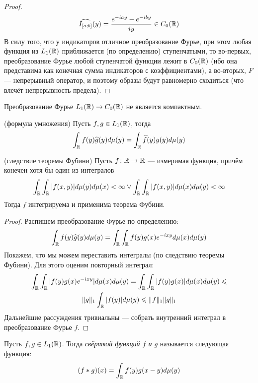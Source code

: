 \begin{proof}
	\[
		\widehat{I_{[a; b]}}(y) = \frac{e^{-iay} - e^{-iby}}{iy} \in C_0(\mathbb{R})
	\]
	В силу того, что у индикаторов отличное преобразование Фурье, при этом любая функция из $L_1(\mathbb{R})$ приближается (по определению) ступенчатыми, то во-первых, преобразование Фурье любой ступенчатой функции лежит в $C_0(\mathbb{R})$ (ибо она представима как конечная сумма индикаторов с коэффициентами), а во-вторых, $F$ --- непрерывный оператор, и поэтому образы будут равномерно сходиться (что влечёт непрерывность предела).
\end{proof}

\begin{exercise}
	Преобразование Фурье $L_1(\mathbb{R}) \to C_0(\mathbb{R})$ не является компактным.
\end{exercise}

\begin{proposition} (формула умножения)
	Пусть $f, g \in L_1(\mathbb{R})$, тогда
	\[
		\int_{\mathbb{R}} f(y)\widehat{g}(y)d\mu(y) = \int_{\mathbb{R}} \widehat{f}(y)g(y)d\mu(y)
	\]
\end{proposition}

\begin{reminder} (следствие теоремы Фубини)
	Пусть $f \colon \mathbb{R} \to \mathbb{R}$ --- измеримая функция, причём конечен хотя бы один из интегралов
	\[
		\int_{\mathbb{R}} \int_{\mathbb{R}} |f(x, y)|d\mu(y)d\mu(x) < \infty \vee \int_{\mathbb{R}} \int_{\mathbb{R}} |f(x, y)|d\mu(x)d\mu(y) < \infty
	\]
	Тогда $f$ интегрируема и применима теорема Фубини.
\end{reminder}

\begin{proof}
	Распишем преобразование Фурье по определению:
	\[
		\int_{\mathbb{R}} f(y)\widehat{g}(y)d\mu(y) = \int_{\mathbb{R}} \int_{\mathbb{R}} f(y)g(x)e^{-ixy}d\mu(x)d\mu(y)
	\]
	Покажем, что мы можем переставить интегралы (по следствию теоремы Фубини). Для этого оценим повторный интеграл:
	\begin{multline*}
		\int_{\mathbb{R}} \int_{\mathbb{R}} |f(y)g(x)e^{-ixy}|d\mu(x)d\mu(y) = \int_{\mathbb{R}} \int_{\mathbb{R}} |f(y)g(x)|d\mu(x)d\mu(y) \leqslant
		\\
		\|g\|_1\int_{\mathbb{R}} |f(y)|d\mu(y) \leqslant \|f\|_1\|g\|_1
	\end{multline*}
	Дальнейшие рассуждения тривиальны --- собрать внутренний интеграл в преобразование Фурье $f$.
\end{proof}

\begin{definition}
	Пусть $f, g \in L_1(\mathbb{R})$. Тогда \textit{свёрткой функций $f$ и $g$} называется следующая функция:
	\[
		(f * g)(x) = \int_{\mathbb{R}} f(y)g(x - y)d\mu(y)
	\]
\end{definition}

